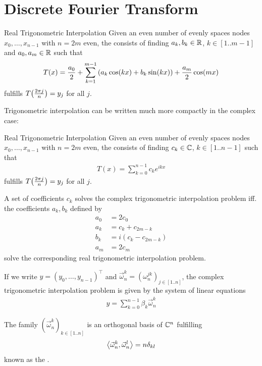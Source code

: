 \section{Discrete Fourier Transform}
\begin{importantdefinition}{Real Trigonometric Interpolation}{}
	Given an even number of evenly spaces nodes $x_0, \hdots, x_{n-1}$ with $n = 2m$ even, the  consists of finding $a_k, b_k \in \mathbb{R}$, $k \in [1..m-1]$ and $a_0, a_m \in \mathbb{R}$ such that
	\begin{align*}
		T(x) = \frac{a_0}{2} + \sum_{k = 1}^{m-1} \qty(a_k \cos(kx) + b_k \sin(kx)) + \frac{a_m}{2} \cos(mx)
	\end{align*}
	fulfills $T\qty(\frac{2\pi j}{n}) = y_j$ for all $j$.
\end{importantdefinition}
Trigonometric interpolation can be written much more compactly in the complex case:
\begin{importantdefinition}{Real Trigonometric Interpolation}{}
	Given an even number of evenly spaces nodes $x_0, \hdots, x_{n-1}$ with $n = 2m$ even, the  consists of finding $c_k \in \mathbb{C}$, $k \in [1..n-1]$ such that
	\begin{align*}
		T(x) = \sum_{k = 0}^{n-1} c_k e^{ikx}
	\end{align*}
	fulfills $T\qty(\frac{2\pi j}{n}) = y_j$ for all $j$.
\end{importantdefinition}
\begin{theorem}
	A set of coefficients $c_k$ solves the complex trigonometric interpolation problem iff. the coefficients $a_k, b_k$ defined by
	\begin{align*}
		a_0 &= 2c_0\\
		a_k &= c_k + c_{2m-k}\\
		b_k &= i(c_k - c_{2m-k})\\
		a_m &= 2c_m
	\end{align*}
	solve the corresponding real trigonometric interpolation problem.
\end{theorem}
If we write $y = (y_0, \hdots, y_{n-1})^\top$ and $\vec \omega_n^k = (\omega_n^{jk})_{j \in [1..n]}$, the complex trigonometric interpolation problem is given by the system of linear equations
\begin{align*}
	y = \sum_{k = 0}^{n-1} \beta_k \vec \omega_n^k
\end{align*}
\begin{importanttheorem}{}{}
	The family $(\vec \omega_n^k)_{k \in [1..n]}$ is an orthogonal basis of $\mathbb{C}^n$ fulfilling
	\begin{align*}
		\left\langle \vec \omega_n^k, \vec \omega_n^l \right\rangle = n\delta_{kl}
	\end{align*}
	known as the .
\end{importanttheorem}
